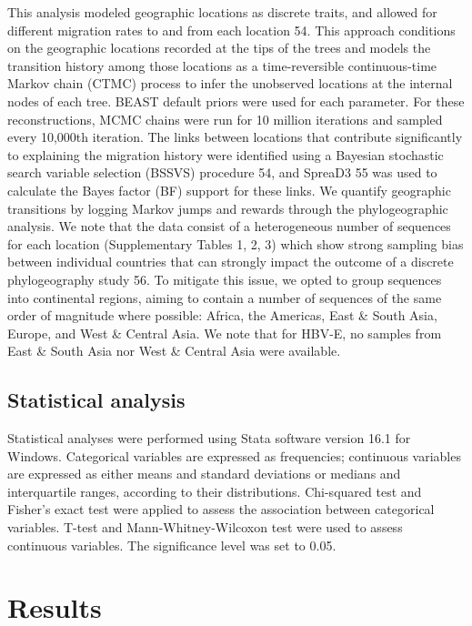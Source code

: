 This analysis modeled geographic locations as discrete traits, and allowed for different migration rates to and from each location 54.
This approach conditions on the geographic locations recorded at the tips of the trees and models the transition history among those locations as a time-reversible continuous-time Markov chain (CTMC) process to infer the unobserved locations at the internal nodes of each tree.
BEAST default priors were used for each parameter. For these reconstructions, MCMC chains were run for 10 million iterations and sampled every 10,000th iteration.
The links between locations that contribute significantly to explaining the migration history were identified using a Bayesian stochastic search variable selection (BSSVS) procedure 54, and SpreaD3 55 was used to calculate the Bayes factor (BF) support for these links.
We quantify geographic transitions by logging Markov jumps and rewards through the phylogeographic analysis. We note that the data consist of a heterogeneous number of sequences for each location (Supplementary Tables 1, 2, 3) which show strong sampling bias between individual countries that can strongly impact the outcome of a discrete phylogeography study 56.
To mitigate this issue, we opted to group sequences into continental regions, aiming to contain a number of sequences of the same order of magnitude where possible: Africa, the Americas, East \& South Asia, Europe, and West \& Central Asia.
We note that for HBV-E, no samples from East \& South Asia nor West \& Central Asia were available.

\subsection{Statistical analysis}
Statistical analyses were performed using Stata software version 16.1 for Windows. Categorical variables are expressed as frequencies; continuous variables are expressed as either means and standard deviations or medians and interquartile ranges, according to their distributions. Chi-squared test and Fisher’s exact test were applied to assess the association between categorical variables. T-test and Mann-Whitney-Wilcoxon test were used to assess continuous variables. The significance level was set to 0.05.

\section{Results}
